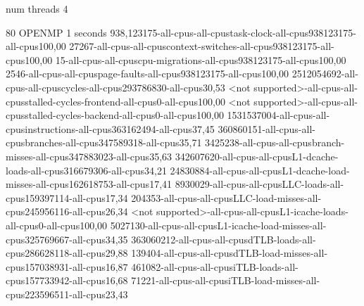 num threads 4

80
OPENMP
1 seconds
938,123175-all-cpus-all-cpustask-clock-all-cpus938123175-all-cpus100,00
27267-all-cpus-all-cpuscontext-switches-all-cpus938123175-all-cpus100,00
15-all-cpus-all-cpuscpu-migrations-all-cpus938123175-all-cpus100,00
2546-all-cpus-all-cpuspage-faults-all-cpus938123175-all-cpus100,00
2512054692-all-cpus-all-cpuscycles-all-cpus293786830-all-cpus30,53
<not supported>-all-cpus-all-cpusstalled-cycles-frontend-all-cpus0-all-cpus100,00
<not supported>-all-cpus-all-cpusstalled-cycles-backend-all-cpus0-all-cpus100,00
1531537004-all-cpus-all-cpusinstructions-all-cpus363162494-all-cpus37,45
360860151-all-cpus-all-cpusbranches-all-cpus347589318-all-cpus35,71
3425238-all-cpus-all-cpusbranch-misses-all-cpus347883023-all-cpus35,63
342607620-all-cpus-all-cpusL1-dcache-loads-all-cpus316679306-all-cpus34,21
24830884-all-cpus-all-cpusL1-dcache-load-misses-all-cpus162618753-all-cpus17,41
8930029-all-cpus-all-cpusLLC-loads-all-cpus159397114-all-cpus17,34
204353-all-cpus-all-cpusLLC-load-misses-all-cpus245956116-all-cpus26,34
<not supported>-all-cpus-all-cpusL1-icache-loads-all-cpus0-all-cpus100,00
5027130-all-cpus-all-cpusL1-icache-load-misses-all-cpus325769667-all-cpus34,35
363060212-all-cpus-all-cpusdTLB-loads-all-cpus286628118-all-cpus29,88
139404-all-cpus-all-cpusdTLB-load-misses-all-cpus157038931-all-cpus16,87
461082-all-cpus-all-cpusiTLB-loads-all-cpus157733942-all-cpus16,68
71221-all-cpus-all-cpusiTLB-load-misses-all-cpus223596511-all-cpus23,43
